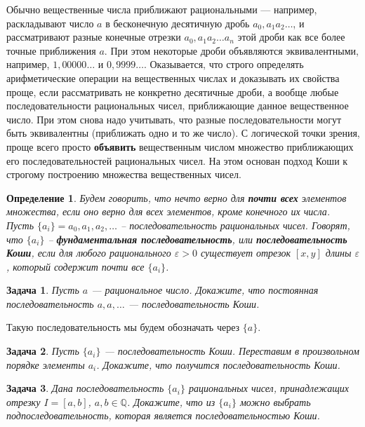 \documentclass[12pt]{book}
\renewcommand{\epsilon}{\varepsilon}
\def\Q{{\mathbb Q}}
\theoremstyle{upshape}
\newtheorem{zadacha}{Задача}[chapter]
\theoremstyle{generic}
\newtheorem{opredelenie}[teorema]{Определение}
\theoremstyle{upshapenonumber}
\newcommand{\следствие}{%
     \refstepcounter{teorema}
     {\noindent\bf Следствие \thechapter.\arabic{teorema}:\ }}
\newcommand{\пример}{%
     \refstepcounter{teorema}
     {\noindent\bf Пример \thechapter.\arabic{teorema}:\ }}
\newcommand{\лемма}{%
     \refstepcounter{teorema}
     {\noindent\bf Лемма \thechapter.\arabic{teorema}:\ }}
\newcommand{\теорема}{%
     \refstepcounter{teorema}
     {\noindent\bf Теорема \thechapter.\arabic{teorema}:\ }}
\newcommand{\утверждение}{%
     \refstepcounter{teorema}
     {\noindent\bf Утверждение \thechapter.\arabic{teorema}:\ }}
\begin{document}
Обычно вещественные числа приближают рациональными --- например,
раскладывают число $a$ в бесконечную десятичную дробь
$a_0,a_1a_2\dots$, и рассматривают разные конечные отрезки
$a_0,a_1a_2 \dots a_n$ этой дроби как все более точные приближения
$a$. При этом некоторые дроби объявляются эквивалентными, например,
$1,00000\dots$ и $0,9999 \dots$. Оказывается, что строго определять
арифметические операции на вещественных числах и доказывать их
свойства проще, если рассматривать не конкретно десятичные дроби, а
вообще любые последовательности рациональных чисел, приближающие
данное вещественное число. При этом снова надо учитывать, что разные
последовательности могут быть эквивалентны (приближать одно и то же
число). С логической точки зрения, проще всего просто {\bf объявить}
вещественным числом множество приближающих его последовательностей
рациональных чисел. На этом основан подход Коши к строгому
построению множества вещественных чисел.

\begin{opredelenie} Будем говорить, что нечто верно для {\bf почти
всех} элементов множества, если оно верно для всех элементов, кроме
конечного их числа. Пусть $\{a_i\}= a_0, a_1, a_2, \ldots$ --
последовательность рациональных чисел. Говорят, что $\{a_i\}$ --
{\bf фундаментальная последовательность}, или {\bf
последовательность Коши}, если для любого рационального
$\epsilon >0$ существует отрезок $[x, y]$ длины 
$\epsilon$, который содержит почти все
$\{a_i\}$.
\end{opredelenie}

\begin{zadacha}
Пусть $a$ --- рациональное число. Докажите, что постоянная
последовательность $a,a,\dots$ --- последовательность Коши.
\end{zadacha}

Такую последовательность мы будем обозначать через $\{a\}$.

\begin{zadacha} Пусть $\{a_i\}$ --- последовательность Коши.
Переставим в произвольном порядке элементы $a_i$. Докажите, что
получится последовательность Коши.
\end{zadacha}

\begin{zadacha} Дана последовательность $\{a_i\}$ рациональных чисел,
принадлежащих отрезку $I = [a, b]$, $a, b \in \Q$. Докажите, что из
$\{a_i\}$ можно выбрать подпоследовательность, которая является
последовательностью Коши.
\end{zadacha}
\end{document}
